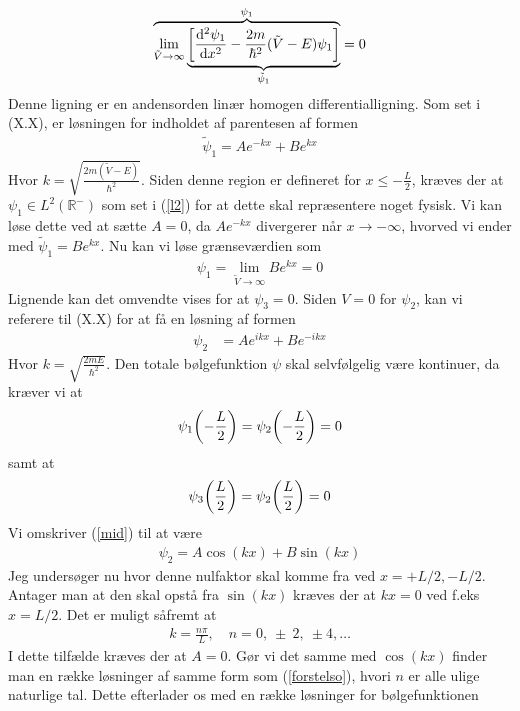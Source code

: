 \documentclass[12pt]{article}
\theoremstyle{definition}
\theoremstyle{remark}
\theoremstyle{definition}
\numberwithin{equation}{section}
\begin{document}
\begin{align}
    \overbrace{
    \lim_{\tilde V\rightarrow \infty} \underbrace{\qty[\dv[2]{\psi_1}{x}-\frac{2m}{\hbar^2}(\tilde V-E)\psi_1]}_{\tilde \psi_1}}^{\psi_1} = 0
\end{align}
Denne ligning er en andensorden linær homogen differentialligning. Som set i (X.X), er løsningen for indholdet af parentesen af formen
\begin{align}
    \tilde \psi_1 = Ae^{-kx}+Be^{kx}
\end{align}
Hvor $\displaystyle k = \sqrt{\frac{2m(\tilde V-E)}{\hbar^2}}$. Siden denne region er defineret for $x\leq-\frac{L}{2}$, kræves der at $\psi_1\in L^2(\mathbb R^-)$ som set i (\ref{l2}) for at dette skal repræsentere noget fysisk. Vi kan løse dette ved at sætte $A=0$, da $Ae^{-kx}$ divergerer når $x\to -\infty$, hvorved vi ender med $\tilde \psi_1=Be^{kx}$. Nu kan vi løse grænseværdien som
\begin{align}
    \psi_1 = \lim_{\tilde V\to \infty } Be^{kx} = 0
\end{align}
Lignende kan det omvendte vises for at $\psi_3=0$. Siden $V=0$ for $\psi_2$, kan vi referere til (X.X) for at få en løsning af formen
\begin{align}
\label{mid}
    \psi_2 &= Ae^{ikx}+Be^{-ikx}
\end{align}
Hvor $\displaystyle k = \sqrt{\frac{2mE}{\hbar^2}}$. Den totale bølgefunktion $\psi$ skal selvfølgelig være kontinuer, da kræver vi at
\begin{align}
\label{betingelsea}
    \psi_1\qty(-\frac{L}{2})=\psi_2\qty(-\frac{L}{2})=0
\end{align}
samt at
\begin{align}
    \psi_3\qty(\frac{L}{2})=\psi_2\qty(\frac{L}{2})=0
\end{align}
Vi omskriver (\ref{mid}) til at være
\begin{align}
    \psi_2 = A\cos(kx)+B\sin(kx)
\end{align}
Jeg undersøger nu hvor denne nulfaktor skal komme fra ved $x=+L/2,-L/2$. Antager man at den skal opstå fra $\sin(kx)$ kræves der at $kx=0$ ved f.eks $x=L/2$. Det er muligt såfremt at 
\begin{align}
\label{forstelso}
    k=\frac{n\pi}{L},\quad n=0,~\pm~2,~\pm 4,\dots
\end{align} I dette tilfælde kræves der at $A=0$. Gør vi det samme med $\cos(kx)$ finder man en række løsninger af samme form som (\ref{forstelso}), hvori $n$ er alle ulige naturlige tal. Dette efterlader os med en række løsninger for bølgefunktionen
\end{document}
